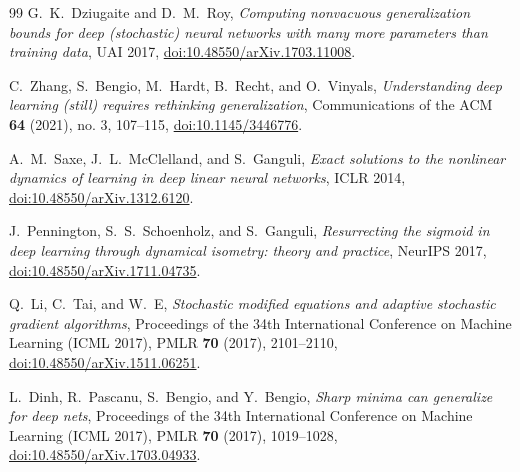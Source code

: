 \documentclass[11pt,reqno]{amsart}
\theoremstyle{definition}
\numberwithin{equation}{section}
\begin{document}
\begin{thebibliography}{99}
G.~K.~Dziugaite and D.~M.~Roy,
\emph{Computing nonvacuous generalization bounds for deep (stochastic) neural networks with many more parameters than training data},
UAI 2017, \href{https://doi.org/10.48550/arXiv.1703.11008}{doi:10.48550/arXiv.1703.11008}.

C.~Zhang, S.~Bengio, M.~Hardt, B.~Recht, and O.~Vinyals,
\emph{Understanding deep learning (still) requires rethinking generalization},
Communications of the ACM \textbf{64} (2021), no. 3, 107--115, \href{https://doi.org/10.1145/3446776}{doi:10.1145/3446776}.

A.~M.~Saxe, J.~L.~McClelland, and S.~Ganguli,
\emph{Exact solutions to the nonlinear dynamics of learning in deep linear neural networks},
ICLR 2014, \href{https://doi.org/10.48550/arXiv.1312.6120}{doi:10.48550/arXiv.1312.6120}.

J.~Pennington, S.~S.~Schoenholz, and S.~Ganguli,
\emph{Resurrecting the sigmoid in deep learning through dynamical isometry: theory and practice},
NeurIPS 2017, \href{https://doi.org/10.48550/arXiv.1711.04735}{doi:10.48550/arXiv.1711.04735}.

Q.~Li, C.~Tai, and W.~E,
\emph{Stochastic modified equations and adaptive stochastic gradient algorithms},
Proceedings of the 34th International Conference on Machine Learning (ICML 2017), PMLR \textbf{70} (2017), 2101--2110,
\href{https://doi.org/10.48550/arXiv.1511.06251}{doi:10.48550/arXiv.1511.06251}.

L.~Dinh, R.~Pascanu, S.~Bengio, and Y.~Bengio,
\emph{Sharp minima can generalize for deep nets},
Proceedings of the 34th International Conference on Machine Learning (ICML 2017), PMLR \textbf{70} (2017), 1019--1028,
\href{https://doi.org/10.48550/arXiv.1703.04933}{doi:10.48550/arXiv.1703.04933}.

\end{thebibliography}
\end{document}
